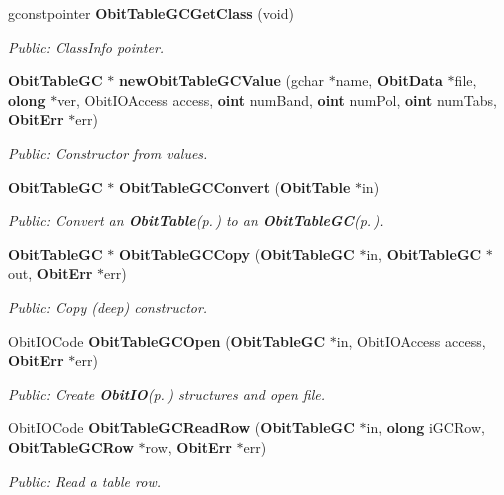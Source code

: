 \begin{CompactItemize}
gconstpointer {\bf Obit\-Table\-GCGet\-Class} (void)
\begin{CompactList}\small\item\em Public: Class\-Info pointer. \item\end{CompactList}\item 
{\bf Obit\-Table\-GC} $\ast$ {\bf new\-Obit\-Table\-GCValue} (gchar $\ast$name, {\bf Obit\-Data} $\ast$file, {\bf olong} $\ast$ver, Obit\-IOAccess access, {\bf oint} num\-Band, {\bf oint} num\-Pol, {\bf oint} num\-Tabs, {\bf Obit\-Err} $\ast$err)
\begin{CompactList}\small\item\em Public: Constructor from values. \item\end{CompactList}\item 
{\bf Obit\-Table\-GC} $\ast$ {\bf Obit\-Table\-GCConvert} ({\bf Obit\-Table} $\ast$in)
\begin{CompactList}\small\item\em Public: Convert an {\bf Obit\-Table}{\rm (p.\,\pageref{structObitTable})} to an {\bf Obit\-Table\-GC}{\rm (p.\,\pageref{structObitTableGC})}. \item\end{CompactList}\item 
{\bf Obit\-Table\-GC} $\ast$ {\bf Obit\-Table\-GCCopy} ({\bf Obit\-Table\-GC} $\ast$in, {\bf Obit\-Table\-GC} $\ast$out, {\bf Obit\-Err} $\ast$err)
\begin{CompactList}\small\item\em Public: Copy (deep) constructor. \item\end{CompactList}\item 
Obit\-IOCode {\bf Obit\-Table\-GCOpen} ({\bf Obit\-Table\-GC} $\ast$in, Obit\-IOAccess access, {\bf Obit\-Err} $\ast$err)
\begin{CompactList}\small\item\em Public: Create {\bf Obit\-IO}{\rm (p.\,\pageref{structObitIO})} structures and open file. \item\end{CompactList}\item 
Obit\-IOCode {\bf Obit\-Table\-GCRead\-Row} ({\bf Obit\-Table\-GC} $\ast$in, {\bf olong} i\-GCRow, {\bf Obit\-Table\-GCRow} $\ast$row, {\bf Obit\-Err} $\ast$err)
\begin{CompactList}\small\item\em Public: Read a table row. \item\end{CompactList}\item 

\end{CompactItemize}
